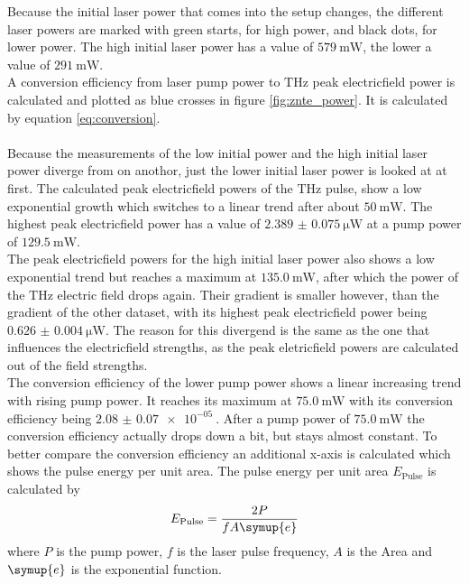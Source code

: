 Because the initial laser power that comes into the setup changes, the different laser powers are marked with green starts, for high power, and black dots, for lower power.
The high initial laser power has a value of $\SI{579}{\milli\W}$, the lower a value of $\SI{291}{\milli\W}$.
\\
A conversion efficiency from laser pump power to $\si{\tera\hertz}$ peak electricfield power is calculated and plotted as blue crosses in figure \ref{fig:znte_power}.
It is calculated by equation \ref{eq:conversion}.
\\\\
Because the measurements of the low initial power and the high initial laser power diverge from on anothor, just the lower initial laser power is looked at at first.
The calculated peak electricfield powers of the $\si{\tera\hertz}$ pulse, show a low exponential growth which switches to a linear trend after about $\SI{50}{\milli\W}$.
The highest peak electricfield power has a value of $\SI{2.389(75)}{\micro\W}$ at a pump power of $\SI{129.5}{\milli\W}$.
\\
The peak electricfield powers for the high initial laser power also shows a low exponential trend but reaches a maximum at $\SI{135.0}{\milli\W}$, after which the power of the $\si{\tera\hertz}$ electric field drops again.
Their gradient is smaller however, than the gradient of the other dataset, with its highest peak electricfield power being $\SI{0.626(4)}{\micro\W}$.
The reason for this divergend is the same as the one that influences the electricfield strengths, as the peak eletricfield powers are calculated out of the field strengths.
\\
The conversion efficiency of the lower pump power shows a linear increasing trend with rising pump power.
It reaches its maximum at $\SI{75.0}{\milli\W}$ with its conversion efficiency being $\SI{2.08(7)e-05}{}$.
After a pump power of $\SI{75.0}{\milli\W}$ the conversion efficiency actually drops down a bit, but stays almost constant.
To better compare the conversion efficiency an additional x-axis is calculated which shows the pulse energy per unit area.
The pulse energy per unit area $E_\text{Pulse}$ is calculated by 
\begin{equation}
    E_\text{Pulse} = \frac{2P}{fA\symup{e}}
    \label{eq:convert_pulse}
\end{equation}
where $P$ is the pump power, $f$ is the laser pulse frequency, $A$ is the Area and $\symup{e}$ is the exponential function.
